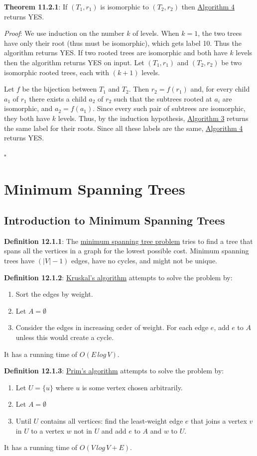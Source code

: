 \documentclass{article}
\newcommand{\separate}[1] {\vspace{#1 pt}\noindent}
\newcommand{\definition}[2]{\textbf{Definition #1}: #2\label{def:#1}}
\newcommand{\proof}[2]{\textit{Proof}: #2 \begin{flushright}\(\square\)\end{flushright}\label{prf:#1}}
\newcommand{\theorem}[3]{\textbf{Theorem #1}: #2 \par\separate{3}\proof{thm:#1}{#3}\label{thm:#1}}
\begin{document}
\noindent\theorem{11.2.1}{If \((T_1,r_1)\) is isomorphic to \((T_2,r_2)\) then \hyperref[alg:Labelled Tree Isomorphism]{Algorithm 4} returns YES.}
{We use induction on the number \(k\) of levels. When \(k=1\), the two trees have only their root (thus must be isomorphic), which gets label 10. Thus the algorithm returns YES. If two rooted trees are isomorphic and both have \(k\) levels then the algorithm returns YES on input. Let \((T_1,r_1)\) and \((T_2,r_2)\) be two isomorphic rooted trees, each with \((k+1)\) levels. 

Let \(f\) be the bijection between \(T_1\) and \(T_2\). Then \(r_2=f(r_1)\) and, for every child \(a_1\) of \(r_1\) there exists a child \(a_2\) of \(r_2\) such that the subtrees rooted at \(a_i\) are isomorphic, and \(a_2 = f(a_1)\). Since every such pair of subtrees are isomorphic, they both have \(k\) levels. Thus, by the induction hypothesis, \hyperref[alg:Label Vertex]{Algorithm 3} returns the same label for their roots. Since all these labels are the same, \hyperref[alg:Labelled Tree Isomorphism]{Algorithm 4} returns YES.}

\section{Minimum Spanning Trees}

\subsection{Introduction to Minimum Spanning Trees}

\definition{12.1.1}{The \underline{minimum spanning tree problem} tries to find a tree that spans all the vertices in a graph for the lowest possible cost. Minimum spanning trees have \((|V|-1)\) edges, have no cycles, and might not be unique.}

\separate{5}\definition{12.1.2}{\underline{Kruskal's algorithm} attempts to solve the problem by:
\begin{enumerate}
    \item Sort the edges by weight.
    \item Let \(A = \emptyset\)
    \item Consider the edges in increasing order of weight. For each edge \(e\), add \(e\) to \(A\) unless this would create a cycle.
\end{enumerate}
It has a running time of \(O(E\,log\,V)\).}

\separate{5}\definition{12.1.3}{\underline{Prim's algorithm} attempts to solve the problem by:
\begin{enumerate}
    \item Let \(U = \{u\}\) where \(u\) is some vertex chosen arbitrarily.
    \item Let \(A = \emptyset\)
    \item Until \(U\) contains all vertices: find the least-weight edge \(e\) that joins a vertex \(v\) in \(U\) to a vertex \(w\) not in \(U\) and add \(e\) to \(A\) and \(w\) to \(U\).
\end{enumerate}
It has a running time of \(O(V\,log\,V + E)\).}
\end{document}
